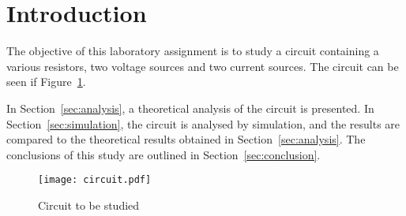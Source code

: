 \section{Introduction}
\label{sec:introduction}

The objective of this laboratory assignment is to study a circuit containing a
various resistors, two voltage sources and two current sources. The circuit can be seen if Figure~\ref{fig:circuit}.


In Section~\ref{sec:analysis}, a theoretical analysis of the circuit is
presented. In Section~\ref{sec:simulation}, the circuit is analysed by
simulation, and the results are compared to the theoretical results obtained in
Section~\ref{sec:analysis}. The conclusions of this study are outlined in
Section~\ref{sec:conclusion}.

\begin{figure}[h] \centering
\texttt{[image: circuit.pdf]}
\caption{Circuit to be studied}
\label{fig:circuit}
\end{figure}

